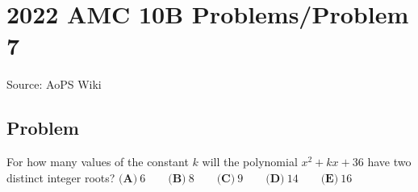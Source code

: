 \documentclass[12pt]{article}
\begin{document}
\section*{{2022 AMC 10B Problems/Problem 7}}
Source: AoPS Wiki

\subsection*{Problem}
For how many values of the constant $k$ will the polynomial $x^{2}+kx+36$ have two distinct integer roots? $\textbf{(A)}\ 6 \qquad\textbf{(B)}\ 8 \qquad\textbf{(C)}\ 9 \qquad\textbf{(D)}\ 14 \qquad\textbf{(E)}\ 16$
\end{document}
